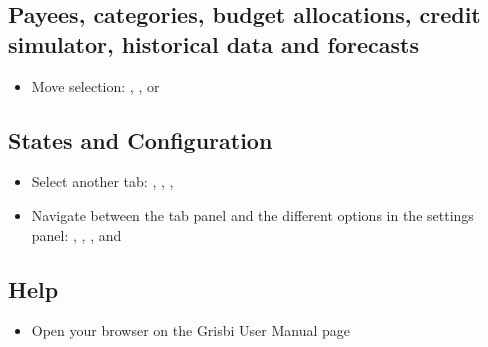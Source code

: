 \subsection{Payees, categories, budget allocations, credit simulator, historical data and forecasts}

\begin{itemize}
\item Move selection: , ,  or 
\end{itemize}


\subsection{States and Configuration}

\begin{itemize}
\item Select another tab: , , , 
\item Navigate between the tab panel and the different options in the settings panel: , , ,  and 
\end{itemize}

\subsection{Help}

\begin{itemize}
\item Open your browser on the Grisbi User Manual page 
\end{itemize}